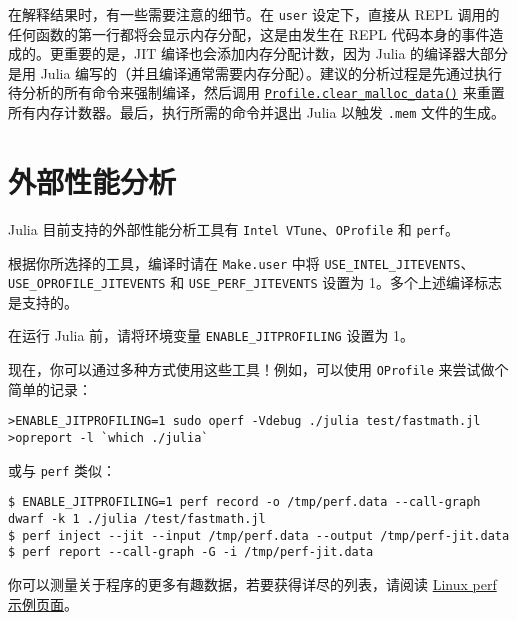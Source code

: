 在解释结果时，有一些需要注意的细节。在 \texttt{user} 设定下，直接从 REPL 调用的任何函数的第一行都将会显示内存分配，这是由发生在 REPL 代码本身的事件造成的。更重要的是，JIT 编译也会添加内存分配计数，因为 Julia 的编译器大部分是用 Julia 编写的（并且编译通常需要内存分配）。建议的分析过程是先通过执行待分析的所有命令来强制编译，然后调用 \hyperlink{12697816172521511938}{\texttt{Profile.clear\_malloc\_data()}} 来重置所有内存计数器。最后，执行所需的命令并退出 Julia 以触发 \texttt{.mem} 文件的生成。



\hypertarget{7694373006850867155}{}


\section{外部性能分析}



Julia 目前支持的外部性能分析工具有 \texttt{Intel VTune}、\texttt{OProfile} 和 \texttt{perf}。



根据你所选择的工具，编译时请在 \texttt{Make.user} 中将 \texttt{USE\_INTEL\_JITEVENTS}、\texttt{USE\_OPROFILE\_JITEVENTS} 和 \texttt{USE\_PERF\_JITEVENTS} 设置为 1。多个上述编译标志是支持的。



在运行 Julia 前，请将环境变量 \texttt{ENABLE\_JITPROFILING} 设置为 1。



现在，你可以通过多种方式使用这些工具！例如，可以使用 \texttt{OProfile} 来尝试做个简单的记录：




\begin{lstlisting}
>ENABLE_JITPROFILING=1 sudo operf -Vdebug ./julia test/fastmath.jl
>opreport -l `which ./julia`
\end{lstlisting}



或与 \texttt{perf} 类似：




\begin{lstlisting}
$ ENABLE_JITPROFILING=1 perf record -o /tmp/perf.data --call-graph dwarf -k 1 ./julia /test/fastmath.jl
$ perf inject --jit --input /tmp/perf.data --output /tmp/perf-jit.data
$ perf report --call-graph -G -i /tmp/perf-jit.data
\end{lstlisting}



你可以测量关于程序的更多有趣数据，若要获得详尽的列表，请阅读 \href{http://www.brendangregg.com/perf.html}{Linux perf 示例页面}。



